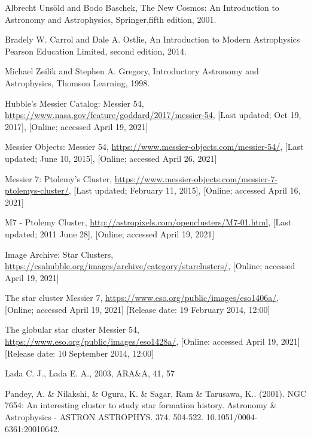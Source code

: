 \documentclass[12pt]{article}
\begin{document}
	\pagebreak
	\begin{thebibliography}{}
		
		{Albrecht Uns\"{o}ld and Bodo Baschek},
		{The New Cosmos: An Introduction to Astronomy and Astrophysics},
		{Springer},{fifth edition}, 2001.
		
		{Bradely W. Carrol and Dale A. Ostlie},
		{An Introduction to Modern Astrophysics}
		{Pearson Education Limited},
		{second edition}, 2014.
		
		{Michael Zeilik and Stephen A. Gregory},
		{Introductory Astronomy and Astrophysics},
		{Thomson Learning}, 1998.
		
		{Hubble's Messier Catalog: Messier 54},
		{\url{https://www.nasa.gov/feature/goddard/2017/messier-54}},
		{[Last updated; Oct 19, 2017]},
		{[Online; accessed April 19, 2021]}
		
		{Messier Objects: Messier 54},
		{\url{https://www.messier-objects.com/messier-54/}},
		{[Last updated; June 10, 2015]},
		{[Online; accessed April 26, 2021]}
		
		{Messier 7: Ptolemy's Cluster},
		{\url{https://www.messier-objects.com/messier-7-ptolemys-cluster/}},
		{[Last updated; February 11, 2015]},
		{[Online; accessed April 16, 2021]}
		
		{M7 - Ptolemy Cluster},
		{\url{http://astropixels.com/openclusters/M7-01.html}},
		{[Last updated; 2011 June 28]},
		{[Online; accessed April 19, 2021]}
		
		{Image Archive: Star Clusters},
		{\url{https://esahubble.org/images/archive/category/starclusters/}},
		{[Online; accessed April 19, 2021]}
		
		{The star cluster Messier 7},
		{\url{https://www.eso.org/public/images/eso1406a/}},
		{[Online; accessed April 19, 2021]}
		{[Release date: 19 February 2014, 12:00]}
		
		{The globular star cluster Messier 54},
		{\url{https://www.eso.org/public/images/eso1428a/}},
		{[Online: accessed April 19, 2021]}
		{[Release date: 10 September 2014, 12:00]}
		
		{Lada C. J., Lada E. A.},
		{2003},
		{ARA\&A, 41, 57}
		
		{Pandey, A. \& Nilakshi, \& Ogura, K. \& Sagar, Ram \& Tarusawa, K.. (2001). NGC 7654: An interesting cluster to study star formation history. Astronomy \& Astrophysics - ASTRON ASTROPHYS. 374. 504-522. 10.1051/0004-6361:20010642.}
		
	\end{thebibliography}
\end{document}

